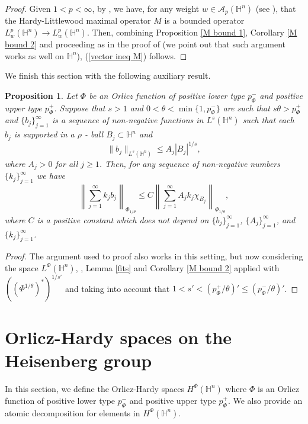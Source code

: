 \documentclass[oneside,10pt]{article}
\newtheorem{proposition}[theorem]{Proposition}
\begin{document}
\begin{proof}
Given $1 < p < \infty$, by \cite[Proposition 7.13]{Hytonen}, we have, for any weight $w \in \mathcal{A}_p(\mathbb{H}^n)$ 
(see \cite[p. 28]{Hytonen}), that the Hardy-Littlewood maximal operator $M$ is a bounded operator 
$L^p_w (\mathbb{H}^n) \to L^p_w (\mathbb{H}^n)$. Then, combining Proposition \ref{M bound 1}, Corollary \ref{M bound 2} and proceeding as in the proof of \cite[Theorem 2.19]{sawa} (we point out that such argument works as well on $\mathbb{H}^n$), (\ref{vector ineq M}) follows.
\end{proof}

We finish this section with the following auxiliary result. 

\begin{proposition} \label{b_j functions}
Let $\Phi$ be an Orlicz function of positive lower type $p_{\Phi}^{-}$ and positive upper type $p_{\Phi}^{+}$. Suppose that $s > 1$ and 
$0 < \theta < \min\{ 1, p_{\Phi}^{-} \}$ are such that $s \theta > p_{\Phi}^{+}$ and $\{ b_j \}_{j=1}^{\infty}$ is a sequence of non-negative functions in $L^{s}(\mathbb{H}^{n})$ such that each $b_j$ is supported in a $\rho$ - ball $B_j \subset \mathbb{H}^{n}$ and
\[
\| b_j \|_{L^{s}(\mathbb{H}^{n})} \leq A_j |B_j|^{1/s},
\]
where $A_j >0$ for all $j \geq 1$. Then, for any sequence of non-negative numbers $\{ k_j \}_{j=1}^{\infty}$ we have
\[
\left\| \sum_{j=1}^{\infty} k_j b_j \right\|_{\Phi_{1/\theta}} \leq C \left\| \sum_{j=1}^{\infty} A_j k_j \chi_{B_j} 
\right\|_{\Phi_{1/\theta}},
\]
where $C$ is a positive constant which does not depend on $\{ b_j \}_{j=1}^{\infty}$, $\{ A_j \}_{j=1}^{\infty}$, and 
$\{ k_j \}_{j=1}^{\infty}$.
\end{proposition}

\begin{proof}
The argument used to proof \cite[Proposition 3.3]{Pablo} also works in this setting, but now considering the space $L^{\Phi}(\mathbb{H}^n)$, 
\cite[Lemma 3.2.11]{Hasto}, Lemma \ref{fits} and Corollary \ref{M bound 2} applied with $\left( (\Phi^{1/\theta})^{*} \right)^{1/s'}$ and taking into account that $1 < s' < (p_{\Phi}^{+}/\theta)' \leq (p_{\Phi}^{-}/\theta)'$. 
\end{proof}

\section{Orlicz-Hardy spaces on the Heisenberg group} \label{OH}

In this section, we define the Orlicz-Hardy spaces $H^{\Phi}(\mathbb{H}^n)$ where $\Phi$ is an Orlicz function of positive lower type 
$p_{\Phi}^{-}$ and positive upper type $p_{\Phi}^{+}$. We also provide an atomic decomposition for elements in $H^{\Phi}(\mathbb{H}^n)$.
\end{document}
